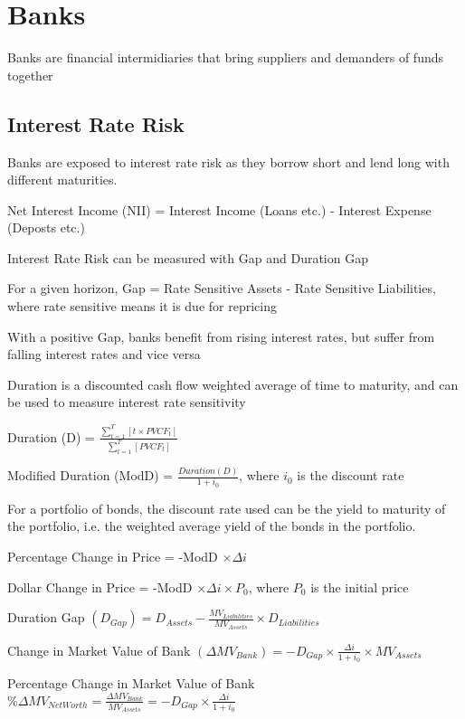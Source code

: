 \section{Banks}
Banks are financial intermidiaries that bring suppliers and demanders of funds
together

\subsection{Interest Rate Risk}
Banks are exposed to interest rate risk as they borrow short and lend long with different maturities.

Net Interest Income (NII) = Interest Income (Loans etc.) - Interest Expense (Deposts etc.)

Interest Rate Risk can be measured with Gap and Duration Gap

For a given horizon, Gap = Rate Sensitive Assets - Rate Sensitive Liabilities, where rate sensitive means it is due for repricing

With a positive Gap, banks benefit from rising interest rates, but suffer from falling interest rates and vice versa

Duration is a discounted cash flow weighted average  of time to maturity, and can be used to measure interest rate sensitivity

Duration (D) = $\frac{\sum^{T}_{t=1}{[t \times PVCF_t]}}{\sum^{T}_{t=1}{[PVCF_t]}}$

Modified Duration (ModD) = $\frac{Duration (D)}{1 + i_0}$, where $i_0$ is the discount rate

\begin{callout}
	For a portfolio of bonds, the discount rate used can be the yield to maturity of the portfolio, i.e. the weighted average yield of the bonds in the portfolio.
\end{callout}

Percentage Change in Price = -ModD $\times \Delta i$

Dollar Change in Price = -ModD $\times \Delta i \times P_0$, where $P_0$ is the initial price

Duration Gap $(D_{Gap}) = D_{Assets} - \frac{MV_{Liabilities}}{MV_{Assets}} \times D_{Liabilities}$

Change in Market Value of Bank $(\Delta MV_{Bank}) = -D_{Gap} \times \frac{\Delta i}{1 + i_0} \times MV_{Assets}$

Percentage Change in Market Value of Bank $\%\Delta MV_{Net Worth} = \frac{\Delta MV_{Bank}}{MV_{Assets}} = -D_{Gap} \times \frac{\Delta i}{1 + i_0}$

